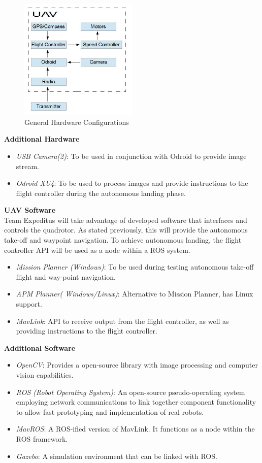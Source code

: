 \documentclass[11pt]{article}
\begin{document}
\begin{figure}[h]
\centering
\includegraphics[width=0.5\textwidth]{UAV_Control_2}
\caption{General Hardware Configurations}
\label{fig:UAV_2}
\end{figure}

\noindent \textbf{Additional Hardware}
\begin{itemize}
\item \textit{USB Camera(2)}: To be used in conjunction with Odroid to provide image stream.
\item \textit{Odroid XU4}: To be used to process images and provide instructions to the flight controller during the autonomous landing phase.
\end{itemize}

\noindent \textbf{UAV Software}\\
Team Expeditus will take advantage of developed software that interfaces and controls the quadrotor. As stated previously, this will provide the autonomous take-off and waypoint navigation. To achieve autonomous landing, the flight controller API will be used as a node within a ROS system. 
\begin{itemize}
\item \textit{Mission Planner (Windows)}: To be used during testing autonomous take-off flight and way-point navigation.
\item \textit{APM Planner( Windows/Linux)}:  Alternative to Mission Planner, has Linux support.
\item \textit{MavLink}: API to receive output from the flight controller, as well as providing instructions to the flight controller.
\end{itemize}

\noindent \textbf{Additional Software}
\begin{itemize}
\item \textit{OpenCV}: Provides a open-source library with image processing and computer vision capabilities.
\item \textit{ROS (Robot Operating System)}: An open-source pseudo-operating system employing network communications to link together component functionality to allow fast prototyping and implementation of real robots.
\item \textit{MavROS}: A ROS-ified version of MavLink. It functions as a node within the ROS framework.
\item \textit{Gazebo}: A simulation environment that can be linked with ROS.
\end{itemize}
\end{document}
